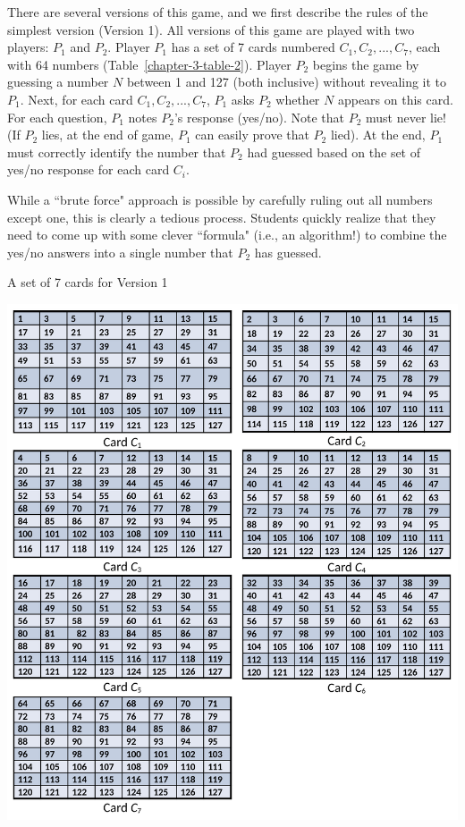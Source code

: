 \begin{multicols}{2}
\begin{table}[H]
\end{table}

There are several versions of this game, and we first describe the rules of the simplest version (Version 1). All versions of this game are played with two players: $P_{1}$ and $P_{2}$. Player $P_{1}$ has a set of 7 cards numbered $C_{1}, C_{2},..., C_{7}$, each with 64 numbers (Table~\ref{chapter-3-table-2}). Player $P_{2}$ begins the game by guessing a number $N$ between 1 and 127 (both inclusive) without revealing it to $P_{1}$. Next, for each card $C_{1}, C_{2}, ..., C_{7}$, $P_{1}$ asks $P_{2}$ whether $N$ appears on this card. For each question, $P_{1}$ notes $P_{2}$'s response (yes/no). Note that $P_{2}$ must never lie! (If $P_{2}$ lies, at the end of game, $P_{1}$ can easily prove that $P_{2}$ lied). At the end, $P_{1}$ must correctly identify the number that $P_{2}$ had guessed based on the set of yes/no response for each card $C_{i}$. 
  
While a ``brute force" approach is possible by carefully ruling out all numbers except one, this is clearly a tedious process. Students quickly realize that they need to come up with some clever ``formula" (i.e., an algorithm!) to combine the yes/no answers into a single number that $P_{2}$ has guessed.  

\begin{table}[H]

\vspace{-.3cm}

\centering
\caption{A set of 7 cards for Version 1}\label{chapter-3-table-2}
\includegraphics[scale=.62]{src/Figures/chap3/table2.jpg}
\end{table} 


\end{multicols}
